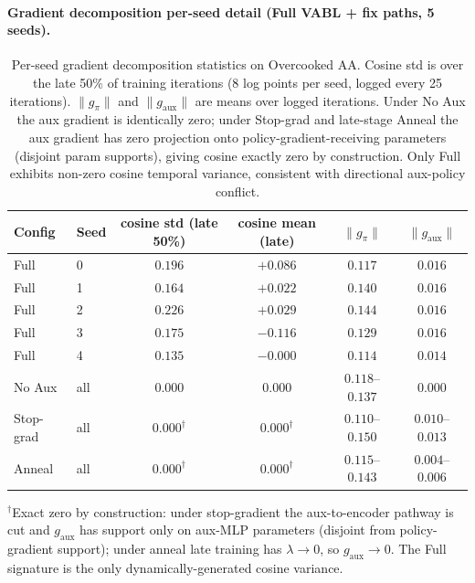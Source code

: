 \documentclass{article}
\theoremstyle{plain}
\theoremstyle{definition}
\theoremstyle{remark}
\begin{document}
\paragraph{Gradient decomposition per-seed detail (Full VABL + fix paths, 5 seeds).}

\begin{table}[H]
\centering
\small
\caption{Per-seed gradient decomposition statistics on Overcooked AA. Cosine std is over the late 50\% of training iterations (8 log points per seed, logged every 25 iterations). $\|g_\pi\|$ and $\|g_{\mathrm{aux}}\|$ are means over logged iterations. Under No Aux the aux gradient is identically zero; under Stop-grad and late-stage Anneal the aux gradient has zero projection onto policy-gradient-receiving parameters (disjoint param supports), giving cosine exactly zero by construction. Only Full exhibits non-zero cosine temporal variance, consistent with directional aux-policy conflict.}
\label{tab:grad_decomp}
\setlength{\tabcolsep}{4pt}
\begin{tabular}{llcccc}
\toprule
\textbf{Config} & \textbf{Seed} & \textbf{cosine std (late 50\%)} & \textbf{cosine mean (late)} & \textbf{$\|g_\pi\|$} & \textbf{$\|g_{\mathrm{aux}}\|$} \\
\midrule
Full      & 0 & $0.196$ & $+0.086$ & $0.117$ & $0.016$ \\
Full      & 1 & $0.164$ & $+0.022$ & $0.140$ & $0.016$ \\
Full      & 2 & $0.226$ & $+0.029$ & $0.144$ & $0.016$ \\
Full      & 3 & $0.175$ & $-0.116$ & $0.129$ & $0.016$ \\
Full      & 4 & $0.135$ & $-0.000$ & $0.114$ & $0.014$ \\
\addlinespace
No Aux    & all & $0.000$ & $0.000$ & $0.118$--$0.137$ & $0.000$ \\
Stop-grad & all & $0.000^\dagger$ & $0.000^\dagger$ & $0.110$--$0.150$ & $0.010$--$0.013$ \\
Anneal    & all & $0.000^\dagger$ & $0.000^\dagger$ & $0.115$--$0.143$ & $0.004$--$0.006$ \\
\bottomrule
\end{tabular}

\vspace{2pt}
{\footnotesize $^\dagger$Exact zero by construction: under stop-gradient the aux-to-encoder pathway is cut and $g_{\mathrm{aux}}$ has support only on aux-MLP parameters (disjoint from policy-gradient support); under anneal late training has $\lambda \to 0$, so $g_{\mathrm{aux}} \to 0$. The Full signature is the only dynamically-generated cosine variance.}
\end{table}
\end{document}

